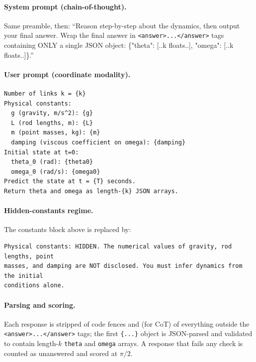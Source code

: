 \documentclass{article}
\begin{document}
\paragraph{System prompt (chain-of-thought).} Same preamble, then: ``Reason step-by-step
about the dynamics, then output your final answer. Wrap the final answer in
\texttt{<answer>...</answer>} tags containing ONLY a single JSON object:
\{"theta": [..k floats..], "omega": [..k floats..]\}.''

\paragraph{User prompt (coordinate modality).}
\begin{small}\begin{verbatim}
Number of links k = {k}
Physical constants:
  g (gravity, m/s^2): {g}
  L (rod lengths, m): {L}
  m (point masses, kg): {m}
  damping (viscous coefficient on omega): {damping}
Initial state at t=0:
  theta_0 (rad): {theta0}
  omega_0 (rad/s): {omega0}
Predict the state at t = {T} seconds.
Return theta and omega as length-{k} JSON arrays.
\end{verbatim}\end{small}

\paragraph{Hidden-constants regime.} The constants block above is replaced by:
\begin{small}\begin{verbatim}
Physical constants: HIDDEN. The numerical values of gravity, rod lengths, point
masses, and damping are NOT disclosed. You must infer dynamics from the initial
conditions alone.
\end{verbatim}\end{small}

\paragraph{Parsing and scoring.} Each response is stripped of code fences and (for CoT) of
everything outside the \texttt{<answer>...</answer>} tags; the first \texttt{\{...\}} object
is JSON-parsed and validated to contain length-$k$ \texttt{theta} and \texttt{omega} arrays.
A response that fails any check is counted as unanswered and scored at $\pi/2$.
\end{document}
